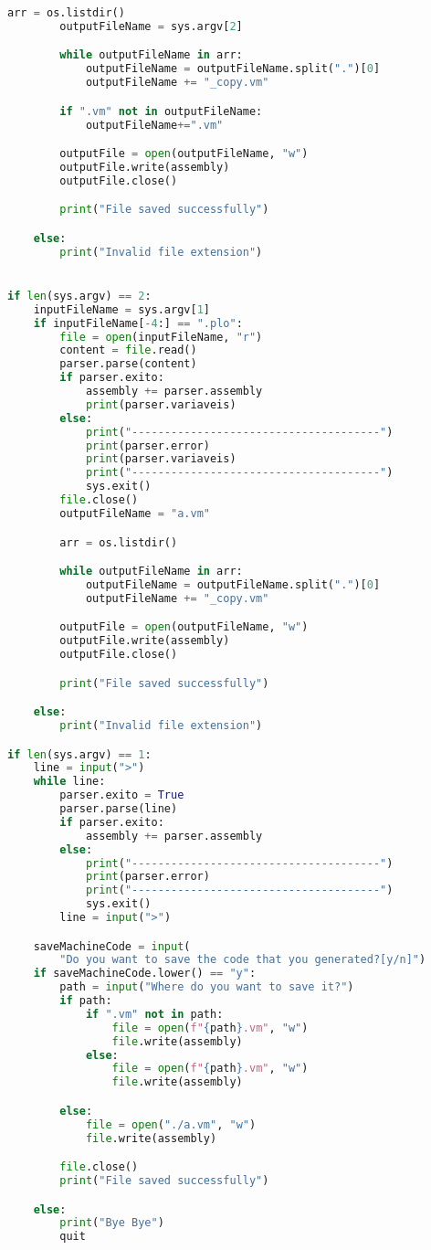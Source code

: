 \documentclass[11pt,a4paper]{report}%
\begin{document}
\begin{scriptsize}
\begin{lstlisting}[language=python]
        arr = os.listdir()
        outputFileName = sys.argv[2]

        while outputFileName in arr:
            outputFileName = outputFileName.split(".")[0]
            outputFileName += "_copy.vm"

        if ".vm" not in outputFileName:
            outputFileName+=".vm"

        outputFile = open(outputFileName, "w")
        outputFile.write(assembly)
        outputFile.close()

        print("File saved successfully")

    else:
        print("Invalid file extension")


if len(sys.argv) == 2:
    inputFileName = sys.argv[1]
    if inputFileName[-4:] == ".plo":
        file = open(inputFileName, "r")
        content = file.read()
        parser.parse(content)
        if parser.exito:
            assembly += parser.assembly
            print(parser.variaveis)
        else:
            print("--------------------------------------")
            print(parser.error)
            print(parser.variaveis)
            print("--------------------------------------")
            sys.exit()
        file.close()
        outputFileName = "a.vm"

        arr = os.listdir()

        while outputFileName in arr:
            outputFileName = outputFileName.split(".")[0]
            outputFileName += "_copy.vm"

        outputFile = open(outputFileName, "w")
        outputFile.write(assembly)
        outputFile.close()

        print("File saved successfully")

    else:
        print("Invalid file extension")

if len(sys.argv) == 1:
    line = input(">")
    while line:
        parser.exito = True
        parser.parse(line)
        if parser.exito:
            assembly += parser.assembly
        else:
            print("--------------------------------------")
            print(parser.error)
            print("--------------------------------------")
            sys.exit()
        line = input(">")

    saveMachineCode = input(
        "Do you want to save the code that you generated?[y/n]")
    if saveMachineCode.lower() == "y":
        path = input("Where do you want to save it?")
        if path:
            if ".vm" not in path:
                file = open(f"{path}.vm", "w")
                file.write(assembly)
            else:
                file = open(f"{path}.vm", "w")
                file.write(assembly)

        else:
            file = open("./a.vm", "w")
            file.write(assembly)

        file.close()
        print("File saved successfully")

    else:
        print("Bye Bye")
        quit

\end{lstlisting}
\end{scriptsize}
\end{document}

